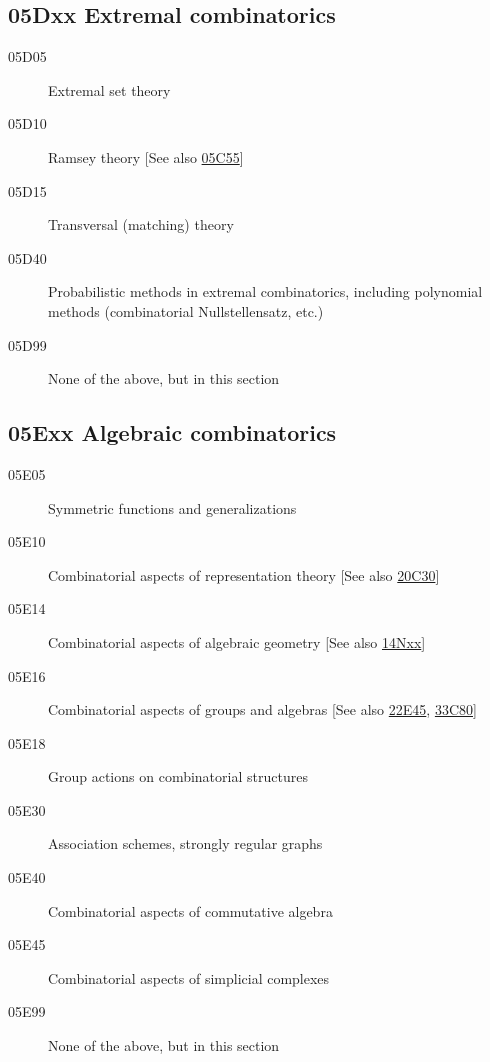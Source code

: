 \subsection*{05Dxx  Extremal combinatorics }\label{05Dxx}
\begin{description}  
\item [05D05]\label{05D05} Extremal set theory
\item [05D10]\label{05D10} Ramsey theory [See also \hyperref[05C55]{05C55}]
\item [05D15]\label{05D15} Transversal (matching) theory
\item [05D40]\label{05D40} Probabilistic methods in extremal combinatorics, including polynomial methods (combinatorial Nullstellensatz, etc.)
\item [05D99]\label{05D99} None of the above, but in this section
\end{description}
\subsection*{05Exx  Algebraic combinatorics }\label{05Exx}
\begin{description}  
\item [05E05]\label{05E05} Symmetric functions and generalizations
\item [05E10]\label{05E10} Combinatorial aspects of representation theory [See also \hyperref[20C30]{20C30}]
\item [05E14]\label{05E14} Combinatorial aspects of algebraic geometry [See also \hyperref[14Nxx]{14Nxx}]
\item [05E16]\label{05E16} Combinatorial aspects of groups and algebras [See also \hyperref[22E45]{22E45}, \hyperref[33C80]{33C80}]
\item [05E18]\label{05E18} Group actions on combinatorial structures
\item [05E30]\label{05E30} Association schemes, strongly regular graphs
\item [05E40]\label{05E40} Combinatorial aspects of commutative algebra
\item [05E45]\label{05E45} Combinatorial aspects of simplicial complexes
\item [05E99]\label{05E99} None of the above, but in this section
\end{description}
